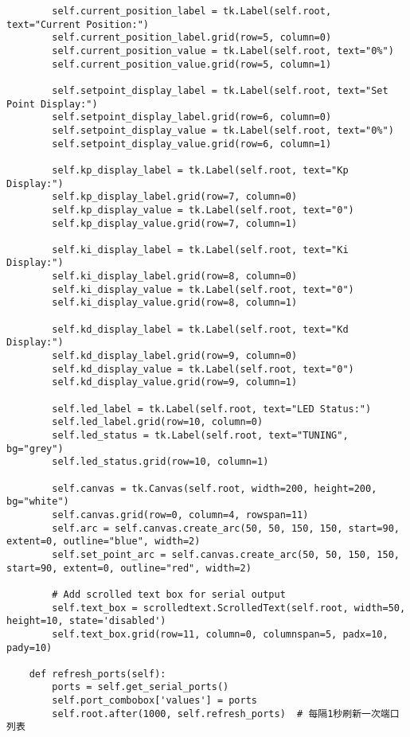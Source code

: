 \documentclass{article}
\begin{document}
\begin{verbatim}
        self.current_position_label = tk.Label(self.root, text="Current Position:")
        self.current_position_label.grid(row=5, column=0)
        self.current_position_value = tk.Label(self.root, text="0%")
        self.current_position_value.grid(row=5, column=1)

        self.setpoint_display_label = tk.Label(self.root, text="Set Point Display:")
        self.setpoint_display_label.grid(row=6, column=0)
        self.setpoint_display_value = tk.Label(self.root, text="0%")
        self.setpoint_display_value.grid(row=6, column=1)

        self.kp_display_label = tk.Label(self.root, text="Kp Display:")
        self.kp_display_label.grid(row=7, column=0)
        self.kp_display_value = tk.Label(self.root, text="0")
        self.kp_display_value.grid(row=7, column=1)

        self.ki_display_label = tk.Label(self.root, text="Ki Display:")
        self.ki_display_label.grid(row=8, column=0)
        self.ki_display_value = tk.Label(self.root, text="0")
        self.ki_display_value.grid(row=8, column=1)

        self.kd_display_label = tk.Label(self.root, text="Kd Display:")
        self.kd_display_label.grid(row=9, column=0)
        self.kd_display_value = tk.Label(self.root, text="0")
        self.kd_display_value.grid(row=9, column=1)

        self.led_label = tk.Label(self.root, text="LED Status:")
        self.led_label.grid(row=10, column=0)
        self.led_status = tk.Label(self.root, text="TUNING", bg="grey")
        self.led_status.grid(row=10, column=1)

        self.canvas = tk.Canvas(self.root, width=200, height=200, bg="white")
        self.canvas.grid(row=0, column=4, rowspan=11)
        self.arc = self.canvas.create_arc(50, 50, 150, 150, start=90, extent=0, outline="blue", width=2)
        self.set_point_arc = self.canvas.create_arc(50, 50, 150, 150, start=90, extent=0, outline="red", width=2)

        # Add scrolled text box for serial output
        self.text_box = scrolledtext.ScrolledText(self.root, width=50, height=10, state='disabled')
        self.text_box.grid(row=11, column=0, columnspan=5, padx=10, pady=10)

    def refresh_ports(self):
        ports = self.get_serial_ports()
        self.port_combobox['values'] = ports
        self.root.after(1000, self.refresh_ports)  # 每隔1秒刷新一次端口列表


\end{verbatim}
\end{document}
